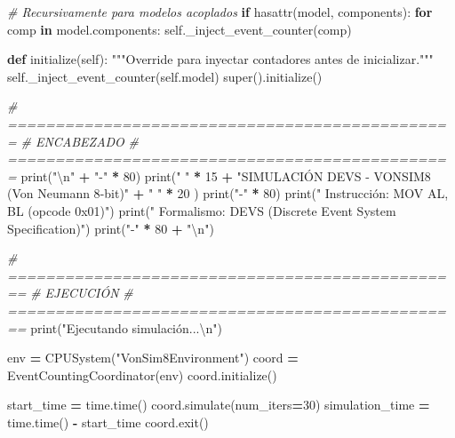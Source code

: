 \documentclass[12pt,oneside]{templates/unerthesis}
\newenvironment{Shaded}{\begin{snugshade}}{\end{snugshade}}
\newcommand{\BuiltInTok}[1]{#1}
\newcommand{\CharTok}[1]{\textcolor[rgb]{0.31,0.60,0.02}{#1}}
\newcommand{\CommentTok}[1]{\textcolor[rgb]{0.56,0.35,0.01}{\textit{#1}}}
\newcommand{\ControlFlowTok}[1]{\textcolor[rgb]{0.13,0.29,0.53}{\textbf{#1}}}
\newcommand{\DecValTok}[1]{\textcolor[rgb]{0.00,0.00,0.81}{#1}}
\newcommand{\KeywordTok}[1]{\textcolor[rgb]{0.13,0.29,0.53}{\textbf{#1}}}
\newcommand{\NormalTok}[1]{#1}
\newcommand{\OperatorTok}[1]{\textcolor[rgb]{0.81,0.36,0.00}{\textbf{#1}}}
\newcommand{\StringTok}[1]{\textcolor[rgb]{0.31,0.60,0.02}{#1}}
\newcommand{\VariableTok}[1]{\textcolor[rgb]{0.00,0.00,0.00}{#1}}
\begin{document}
\begin{Shaded}
\begin{Highlighting}[]
            \CommentTok{\# Recursivamente para modelos acoplados}
            \ControlFlowTok{if} \BuiltInTok{hasattr}\NormalTok{(model, }\StringTok{\textquotesingle{}components\textquotesingle{}}\NormalTok{):}
                \ControlFlowTok{for}\NormalTok{ comp }\KeywordTok{in}\NormalTok{ model.components:}
                    \VariableTok{self}\NormalTok{.\_inject\_event\_counter(comp)}
        
        \KeywordTok{def}\NormalTok{ initialize(}\VariableTok{self}\NormalTok{):}
            \StringTok{"""Override para inyectar contadores antes de }
\StringTok{            inicializar."""}
            \VariableTok{self}\NormalTok{.\_inject\_event\_counter(}\VariableTok{self}\NormalTok{.model)}
            \BuiltInTok{super}\NormalTok{().initialize()}
    
    \CommentTok{\# ===============================================}
    \CommentTok{\# ENCABEZADO}
    \CommentTok{\# ===============================================}
    \BuiltInTok{print}\NormalTok{(}\StringTok{"}\CharTok{\textbackslash{}n}\StringTok{"} \OperatorTok{+} \StringTok{"{-}"} \OperatorTok{*} \DecValTok{80}\NormalTok{)}
    \BuiltInTok{print}\NormalTok{(}\StringTok{" "} \OperatorTok{*} \DecValTok{15} \OperatorTok{+} \StringTok{"SIMULACIÓN DEVS {-} VONSIM8 (Von Neumann 8{-}bit)"}
    \OperatorTok{+} \StringTok{" "} \OperatorTok{*} \DecValTok{20}\NormalTok{ )}
    \BuiltInTok{print}\NormalTok{(}\StringTok{"{-}"} \OperatorTok{*} \DecValTok{80}\NormalTok{)}
    \BuiltInTok{print}\NormalTok{(}\StringTok{"  Instrucción: MOV AL, BL (opcode 0x01)"}\NormalTok{)}
    \BuiltInTok{print}\NormalTok{(}\StringTok{"  Formalismo:  DEVS (Discrete Event System Specification)"}\NormalTok{)}
    \BuiltInTok{print}\NormalTok{(}\StringTok{"{-}"} \OperatorTok{*} \DecValTok{80} \OperatorTok{+} \StringTok{"}\CharTok{\textbackslash{}n}\StringTok{"}\NormalTok{)}
    
    \CommentTok{\# ================================================}
    \CommentTok{\# EJECUCIÓN}
    \CommentTok{\# ================================================}
    \BuiltInTok{print}\NormalTok{(}\StringTok{"Ejecutando simulación...}\CharTok{\textbackslash{}n}\StringTok{"}\NormalTok{)}
    
\NormalTok{    env }\OperatorTok{=}\NormalTok{ CPUSystem(}\StringTok{"VonSim8Environment"}\NormalTok{)}
\NormalTok{    coord }\OperatorTok{=}\NormalTok{ EventCountingCoordinator(env)}
\NormalTok{    coord.initialize()}
    
\NormalTok{    start\_time }\OperatorTok{=}\NormalTok{ time.time()}
\NormalTok{    coord.simulate(num\_iters}\OperatorTok{=}\DecValTok{30}\NormalTok{)}
\NormalTok{    simulation\_time }\OperatorTok{=}\NormalTok{ time.time() }\OperatorTok{{-}}\NormalTok{ start\_time}
\NormalTok{    coord.exit()}
    

\end{Highlighting}
\end{Shaded}
\end{document}
